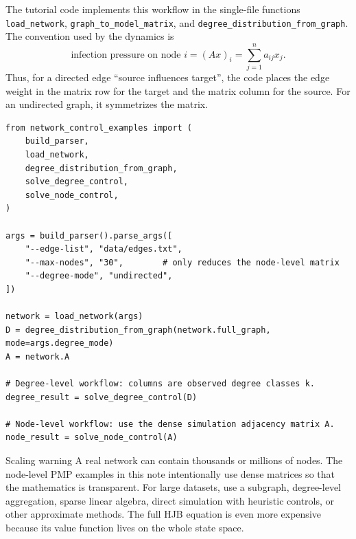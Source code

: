 \documentclass[11pt,a4paper]{article}
\begin{document}
The tutorial code implements this workflow in the single-file functions \texttt{load\_network}, \texttt{graph\_to\_model\_matrix}, and \texttt{degree\_distribution\_from\_graph}. The convention used by the dynamics is
\begin{equation}
  \text{infection pressure on node } i=(Ax)_i=\sum_{j=1}^n a_{ij}x_j.
\end{equation}
Thus, for a directed edge ``source influences target'', the code places the edge weight in the matrix row for the target and the matrix column for the source. For an undirected graph, it symmetrizes the matrix.


\begin{lstlisting}[caption={Minimal example: load an edge-list dataset, compute the degree distribution, and run degree-level and node-level models.}]
from network_control_examples import (
    build_parser,
    load_network,
    degree_distribution_from_graph,
    solve_degree_control,
    solve_node_control,
)

args = build_parser().parse_args([
    "--edge-list", "data/edges.txt",
    "--max-nodes", "30",        # only reduces the node-level matrix
    "--degree-mode", "undirected",
])

network = load_network(args)
D = degree_distribution_from_graph(network.full_graph, mode=args.degree_mode)
A = network.A

# Degree-level workflow: columns are observed degree classes k.
degree_result = solve_degree_control(D)

# Node-level workflow: use the dense simulation adjacency matrix A.
node_result = solve_node_control(A)
\end{lstlisting}

\begin{cautionbox}{Scaling warning}
A real network can contain thousands or millions of nodes. The node-level PMP examples in this note intentionally use dense matrices so that the mathematics is transparent. For large datasets, use a subgraph, degree-level aggregation, sparse linear algebra, direct simulation with heuristic controls, or other approximate methods. The full HJB equation is even more expensive because its value function lives on the whole state space.
\end{cautionbox}
\end{document}
